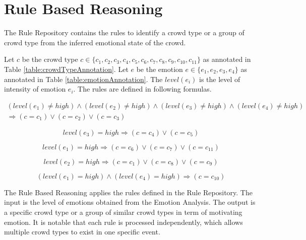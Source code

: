 \section{Rule Based Reasoning}

The Rule Repository contains the rules to identify a crowd type or a group of crowd type from the inferred emotional state of the crowd. 

Let \(c\) be the crowd type \(c \in \{c_1, c_2, c_3, c_4, c_5, c_6, c_7, c_8, c_9, c_{10}, c_{11}\}\) as annotated in Table \ref{table:crowdTypeAnnotation}. Let \(e\) be the emotion \(e \in \{e_1, e_2, e_3, e_4\}\) as annotated in Table \ref{table:emotionAnnotation}. The \(level(e_i)\) is the level of intensity of emotion \(e_i\). The rules are defined in following formulas.

\begin{equation}
\label{eq:rule1}
\begin{split}
	(level(e_1) \neq high) \land (level(e_2) \neq high) \land (level(e_3) \neq high) \land (level(e_4) \neq high) \\
	\Rightarrow (c = c_1) \lor (c = c_2) \lor (c = c_3)
\end{split}
\end{equation}

\begin{equation}
\label{eq:rule2}
	level(e_3) = high \Rightarrow (c = c_4) \lor (c = c_5)
\end{equation}

\begin{equation}
\label{eq:rule3}
	level(e_1) = high \Rightarrow (c = c_6) \lor (c = c_7) \lor (c = c_{11})
\end{equation}

\begin{equation}
\label{eq:rule4}
	level(e_2) = high \Rightarrow (c = c_1) \lor (c = c_8) \lor (c = c_9)
\end{equation}

\begin{equation}
\label{eq:rule5}
	(level(e_1) = high) \land (level(e_4) = high) \Rightarrow (c = c_{10})
\end{equation}

The Rule Based Reasoning applies the rules defined in the Rule Repository. The input is the level of emotions obtained from the Emotion Analysis. The output is a specific crowd type or a group of similar crowd types in term of motivating emotion. It is notable that each rule is processed independently, which allows multiple crowd types to exist in one specific event.

